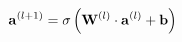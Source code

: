 \documentclass[preview]{standalone}
\begin{document}
\begin{align*}
\special{dvisvgm:raw <g id='unique000'>}\mathbf{a}^{(l+1)} = \sigma\left(\mathbf{W}^{(l)} \cdot \mathbf{a}^{(l)} + \mathbf{b}\right)\special{dvisvgm:raw </g>}
\end{align*}
\end{document}
